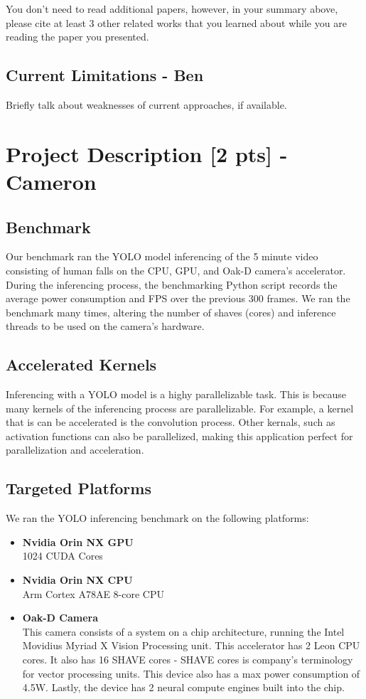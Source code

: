 \documentclass[sigconf,authorversion,nonacm]{acmart}
\begin{document}
You don't need to read additional papers, however, in your summary above, please cite at least 3 other related works that you learned about while you are reading the paper you presented. 

\subsection{Current Limitations - Ben}
Briefly talk about weaknesses of current approaches, if available. 

\section{Project Description  {\small {[2 pts]}} - Cameron}

\subsection{Benchmark}
Our benchmark ran the YOLO model inferencing of the 5 minute video consisting of human falls on the CPU, GPU, and Oak-D camera's accelerator. During the inferencing process, the benchmarking Python script records the average power consumption and FPS over the previous 300 frames. We ran the benchmark many times, altering the number of shaves (cores) and inference threads to be used on the camera's hardware.

\subsection{Accelerated Kernels}
Inferencing with a YOLO model is a highy parallelizable task. This is because many kernels of the inferencing process are parallelizable. For example, a kernel that is can be accelerated is the convolution process. Other kernals, such as activation functions can also be parallelized, making this application perfect for parallelization and acceleration.

\subsection{Targeted Platforms}
We ran the YOLO inferencing benchmark on the following platforms:
\begin{itemize}
    \item \textbf{Nvidia Orin NX GPU} \\ 1024 CUDA Cores
    \item \textbf{Nvidia Orin NX CPU} \\ Arm Cortex A78AE 8-core CPU
    \item \textbf{Oak-D Camera} \\ This camera consists of a system on a chip architecture, running the Intel Movidius Myriad X Vision Processing unit. This accelerator has 2 Leon CPU cores. It also has 16 SHAVE cores - SHAVE cores is company's terminology for vector processing units. This device also has a max power consumption of 4.5W. Lastly, the device has 2 neural compute engines built into the chip.
\end{itemize}
\end{document}
